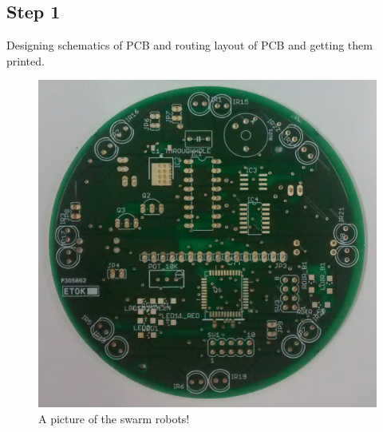 \documentclass[a4paper,12pt,oneside]{book}
\begin{document}
\subsection*{Step 1}
Designing schematics of PCB and routing layout of PCB and getting them printed.
\hfill\\
\begin{figure}[h!]
	\caption{A picture of the swarm robots!}
	\includegraphics[width=\textwidth]{./Pictures/PCB_front}		
\end{figure}	
\hfill\\
\end{document}
